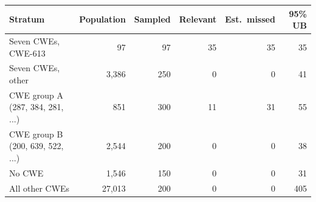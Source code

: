 \begin{tabular}{lrrrrr}
\toprule
Stratum & Population & Sampled & Relevant & Est.\ missed & 95\% UB \\
\midrule
Seven CWEs, CWE-613 & 97 & 97 & 35 & 35 & 35 \\
Seven CWEs, other & 3,386 & 250 & 0 & 0 & 41 \\
CWE group A (287, 384, 281, ...) & 851 & 300 & 11 & 31 & 55 \\
CWE group B (200, 639, 522, ...) & 2,544 & 200 & 0 & 0 & 38 \\
No CWE & 1,546 & 150 & 0 & 0 & 31 \\
All other CWEs & 27,013 & 200 & 0 & 0 & 405 \\
\bottomrule
\end{tabular}
